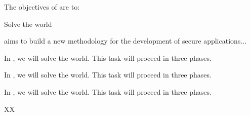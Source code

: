 \addtocounter{wpno}{1}
\begin{Workpackage}{\thewpno}
\WPTitle{\wpname{\thewpno}}


\begin{WPObjectives}
The objectives of \theWP{} are to:
\begin{compactitem}
\item Solve the world
\end{compactitem}
\end{WPObjectives}

\begin{WPDescription}
\theWP{} aims to build a new methodology for the development of secure applications...
\end{WPDescription}

\begin{Task}

\TaskResults{%
}
\TaskHeader{}

In \theTask, we will solve the world. 
This task will proceed in three phases. 
\end{Task}

\begin{Task}
	
	\TaskResults{%
	}
	\TaskHeader{}
	
	In \theTask, we will solve the world. 
	This task will proceed in three phases. 
\end{Task}

\begin{Task}
	
	\TaskResults{%
	}
	\TaskHeader{}
	
	In \theTask, we will solve the world. 
	This task will proceed in three phases. 
\end{Task}

\begin{WPDeliverables}
  \begin{compactitem}
    \item XX
\end{compactitem}
\end{WPDeliverables}
\end{Workpackage}
